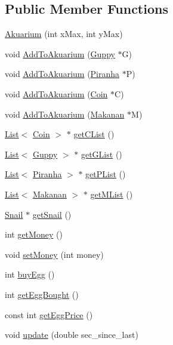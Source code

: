 \subsection*{Public Member Functions}
\begin{DoxyCompactItemize}
\item 
\mbox{\hyperlink{class_akuarium_a09356fa0405a5c8db4b048665456e1ce}{Akuarium}} (int x\+Max, int y\+Max)
\item 
void \mbox{\hyperlink{class_akuarium_acd7f2fd40ce2ca063c3ddfacf1a84ea3}{Add\+To\+Akuarium}} (\mbox{\hyperlink{class_guppy}{Guppy}} $\ast$G)
\item 
void \mbox{\hyperlink{class_akuarium_a167b796ece0cdd537c5c6624ed15760c}{Add\+To\+Akuarium}} (\mbox{\hyperlink{class_piranha}{Piranha}} $\ast$P)
\item 
void \mbox{\hyperlink{class_akuarium_a1f4f9363a6d7293e24768b6f70ee2eae}{Add\+To\+Akuarium}} (\mbox{\hyperlink{class_coin}{Coin}} $\ast$C)
\item 
void \mbox{\hyperlink{class_akuarium_a83bb5abf33474615c762124429a350be}{Add\+To\+Akuarium}} (\mbox{\hyperlink{class_makanan}{Makanan}} $\ast$M)
\item 
\mbox{\hyperlink{class_list}{List}}$<$ \mbox{\hyperlink{class_coin}{Coin}} $>$ $\ast$ \mbox{\hyperlink{class_akuarium_a8eebf8e6e312dee21e4d790de5e6f614}{get\+C\+List}} ()
\item 
\mbox{\hyperlink{class_list}{List}}$<$ \mbox{\hyperlink{class_guppy}{Guppy}} $>$ $\ast$ \mbox{\hyperlink{class_akuarium_aea95fa5feed9d17dd8cee6a716413222}{get\+G\+List}} ()
\item 
\mbox{\hyperlink{class_list}{List}}$<$ \mbox{\hyperlink{class_piranha}{Piranha}} $>$ $\ast$ \mbox{\hyperlink{class_akuarium_ad6e04ad77928d85f6739b76c9efaaa67}{get\+P\+List}} ()
\item 
\mbox{\hyperlink{class_list}{List}}$<$ \mbox{\hyperlink{class_makanan}{Makanan}} $>$ $\ast$ \mbox{\hyperlink{class_akuarium_aceb32b9271d3de1c5383151d68a16cdb}{get\+M\+List}} ()
\item 
\mbox{\hyperlink{class_snail}{Snail}} $\ast$ \mbox{\hyperlink{class_akuarium_a846c24525e4bec5b355e34924d8a5784}{get\+Snail}} ()
\item 
int \mbox{\hyperlink{class_akuarium_a641dd24ff82bc9eab91c119cef4ac06c}{get\+Money}} ()
\item 
void \mbox{\hyperlink{class_akuarium_a6be2d50883019668db71ef5128851202}{set\+Money}} (int money)
\item 
int \mbox{\hyperlink{class_akuarium_ab68614c24c06e011b93cc5d03103f352}{buy\+Egg}} ()
\item 
int \mbox{\hyperlink{class_akuarium_ad5c60aa9ac76b1af2de9ed50765ef9cf}{get\+Egg\+Bought}} ()
\item 
const int \mbox{\hyperlink{class_akuarium_a45b387e510e5a938017908a63d22283c}{get\+Egg\+Price}} ()
\item 
void \mbox{\hyperlink{class_akuarium_af7c9d5e5b90bd3c0cef6e91777bb3978}{update}} (double sec\+\_\+since\+\_\+last)
\end{DoxyCompactItemize}


